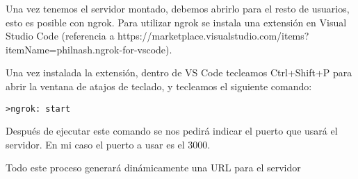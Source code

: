 \begin{itemize}
Una vez tenemos el servidor montado, debemos abrirlo para el resto de usuarios, esto es posible con ngrok. Para utilizar ngrok se instala una extensión en Visual Studio Code (referencia a https://marketplace.visualstudio.com/items?itemName=philnash.ngrok-for-vscode).

Una vez instalada la extensión, dentro de VS Code tecleamos Ctrl+Shift+P para abrir la ventana de atajos de teclado, y tecleamos el siguiente comando:

\begin{lstlisting}
>ngrok: start 
\end{lstlisting}

Después de ejecutar este comando se nos pedirá indicar el puerto que usará el servidor. En mi caso el puerto a usar es el 3000.

Todo este proceso generará dinámicamente una URL para el servidor


\end{itemize}